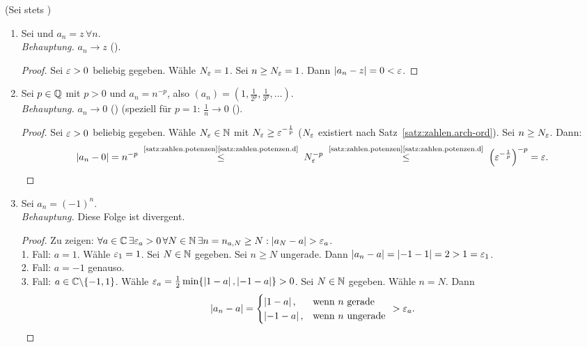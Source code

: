 \documentclass[12pt]{scrreprt}
\begin{document}
\begin{bsp}
  \label{bsp:konv.konv}
  (Sei stets )
  \begin{enumerate}
  \item Sei  und $a_n = z \,\forall n$.\\
    \emph{Behauptung.} $a_n\to z$ (\ninf).
    \begin{proof} Sei $\varepsilon>0$ beliebig gegeben. Wähle $N_\varepsilon=1$. Sei
      $n \ge N_\varepsilon=1$. Dann $\left\lvert a_n-z\right\lvert=0<\varepsilon$. \end{proof}
  \item Sei $p\in\mathbb{Q}$ mit $p>0$ und $a_n=n^{-p}$, also
    $(a_n)=(1,\frac{1}{2^p},\frac{1}{3^p}, \ldots)$.\\
    \emph{Behauptung.} $a_n\to0$ (\ninf) (speziell für $p=1$:
    $\frac{1}{n}\to0$ (\ninf).
    \begin{proof} Sei $\varepsilon>0$ beliebig gegeben. Wähle $N_\varepsilon\in\mathbb{N}$
      mit $N_\varepsilon\ge\varepsilon^{-\frac{1}{p}}$ ($N_\varepsilon$ existiert nach
      Satz~\ref{satz:zahlen.arch-ord}). Sei $n\ge N_\varepsilon$. Dann:
      \[\abs{a_n-0}=n^{-p}
      \nach{\le}{\ref{satz:zahlen.potenzen}\ref{satz:zahlen.potenzen.d}}
      N_\ep^{-p}
      \nach{\le}{\ref{satz:zahlen.potenzen}\ref{satz:zahlen.potenzen.d}}
      \left(\ep^{-\frac{1}{p}}\right)^{-p}=\ep.\]
    \end{proof}
  \item Sei $a_n=(-1)^n$.\\
    \emph{Behauptung.} Diese Folge ist divergent.
    \begin{proof} Zu zeigen: $\forall a\in\mathbb{C}\,\exists \varepsilon_a>0
      \,\forall N\in\mathbb{N} \,\exists n=n_{a,N}\ge N:
      \left\lvert a_N-a\right\lvert>\varepsilon_a$.\\
      1. Fall: $a=1$. Wähle $\varepsilon_1=1$. Sei $N\in\mathbb{N}$ gegeben. Sei $n
      \ge N$ ungerade. Dann $\left\lvert a_n-a\right\lvert=\left\lvert-1-1\right\lvert=2>1=\varepsilon_1$.\\
      2. Fall: $a=-1$ genauso.\\
      3. Fall: $a\in\mathbb{C}\backslash\{-1,1\}$. Wähle
      $\varepsilon_a=\frac12\min\{\left\lvert1-a\right\lvert,\left\lvert-1-a\right\lvert\}>0$. Sei $N\in\mathbb{N}$
      gegeben. Wähle $n=N$. Dann \[\left\lvert a_n-a\right\lvert=\begin{cases}
        \left\lvert1-a\right\lvert, & \text{wenn }n\text{ gerade}\\ \left\lvert-1-a\right\lvert, &
        \text{wenn }n\text{ ungerade} \end{cases}\
      >\varepsilon_a.\] \end{proof}
  \end{enumerate}
\end{bsp}
\end{document}
